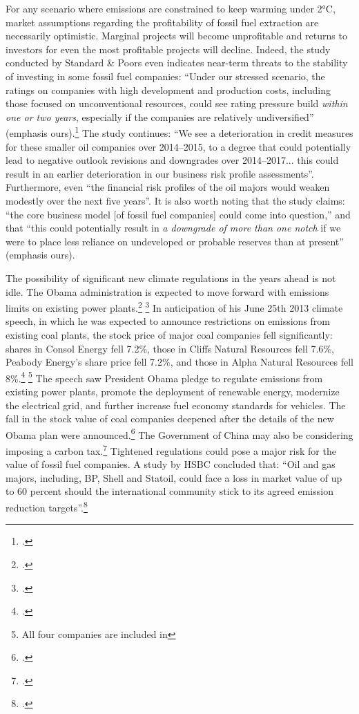 For any scenario where emissions are constrained to keep warming under 2°C, market assumptions regarding the profitability of fossil fuel extraction are necessarily optimistic. 
Marginal projects will become unprofitable and returns to investors for even the most profitable projects will decline. 
Indeed, the study conducted by Standard \& Poors even indicates near-term threats to the stability of investing in some fossil fuel companies: ``Under our stressed scenario, the ratings on companies with high development and production costs, including those focused on unconventional resources, could see rating pressure build \emph{within one or two years}, especially if the companies are relatively undiversified'' (emphasis ours).\footcite{SandPConstrained}
The study continues: ``We see a deterioration in credit measures for these smaller oil companies over 2014--2015, to a degree that could potentially lead to negative outlook revisions and downgrades over 2014--2017... this could result in an earlier deterioration in our business risk profile assessments''.
Furthermore, even ``the financial risk profiles of the oil majors would weaken modestly over the next five years''.
It is also worth noting that the study claims: ``the core business model [of fossil fuel companies] could come into question,'' and that ``this could potentially result in \emph{a downgrade of more than one notch} if we were to place less reliance on undeveloped or probable reserves than at present'' (emphasis ours).



The possibility of significant new climate regulations in the years ahead is not idle.
The Obama administration is expected to move forward with emissions limits on existing power plants.\footcite[][]{ReadyingLimits} \footcite[][]{ObamaJune2013}
In anticipation of his June 25th 2013 climate speech, in which he was expected to announce restrictions on  emissions from existing coal plants, the stock price of major coal companies fell significantly: shares in Consol Energy fell 7.2\%, those in Cliffs Natural Resources fell 7.6\%, Peabody Energy's share price fell 7.2\%, and those in Alpha Natural Resources fell 8\%.\footcite[][]{CoalSharesPlunge} \footnote{All four companies are included in }
The speech saw President Obama pledge to regulate  emissions from existing power plants, promote the deployment of renewable energy, modernize the electrical grid, and further increase fuel economy standards for vehicles.
The fall in the stock value of coal companies deepened after the details of the new Obama plan were announced.\footcite[][]{CCPlanPoundsCoal}
The Government of China may also be considering imposing a carbon tax.\footcite[][]{ChinaTaxingCarbon}
Tightened regulations could pose a major risk for the value of fossil fuel companies.
A study by HSBC concluded that: ``Oil and gas majors, including, BP, Shell and Statoil, could face a loss in market value of up to 60 percent should the international community stick to its agreed emission reduction targets''.\footcite[][]{EconomicCase}



